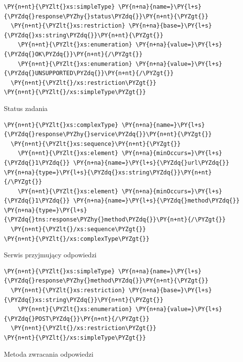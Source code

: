 \begin{program}
\begin{code}
\begin{Verbatim}[commandchars=\\\{\}]
\PY{n+nt}{\PYZlt{}xs:simpleType} \PY{n+na}{name=}\PY{l+s}{\PYZdq{}response\PYZhy{}status\PYZdq{}}\PY{n+nt}{\PYZgt{}}
  \PY{n+nt}{\PYZlt{}xs:restriction} \PY{n+na}{base=}\PY{l+s}{\PYZdq{}xs:string\PYZdq{}}\PY{n+nt}{\PYZgt{}}
    \PY{n+nt}{\PYZlt{}xs:enumeration} \PY{n+na}{value=}\PY{l+s}{\PYZdq{}OK\PYZdq{}}\PY{n+nt}{/\PYZgt{}}
    \PY{n+nt}{\PYZlt{}xs:enumeration} \PY{n+na}{value=}\PY{l+s}{\PYZdq{}UNSUPPORTED\PYZdq{}}\PY{n+nt}{/\PYZgt{}}
  \PY{n+nt}{\PYZlt{}/xs:restriction\PYZgt{}}
\PY{n+nt}{\PYZlt{}/xs:simpleType\PYZgt{}}
\end{Verbatim}
\end{code}
\caption{Status zadania}
\end{program}

\begin{program}
\begin{code}
\begin{Verbatim}[commandchars=\\\{\}]
\PY{n+nt}{\PYZlt{}xs:complexType} \PY{n+na}{name=}\PY{l+s}{\PYZdq{}response\PYZhy{}service\PYZdq{}}\PY{n+nt}{\PYZgt{}}
  \PY{n+nt}{\PYZlt{}xs:sequence}\PY{n+nt}{\PYZgt{}}
    \PY{n+nt}{\PYZlt{}xs:element} \PY{n+na}{minOccurs=}\PY{l+s}{\PYZdq{}1\PYZdq{}} \PY{n+na}{name=}\PY{l+s}{\PYZdq{}url\PYZdq{}} \PY{n+na}{type=}\PY{l+s}{\PYZdq{}xs:string\PYZdq{}}\PY{n+nt}{/\PYZgt{}}
    \PY{n+nt}{\PYZlt{}xs:element} \PY{n+na}{minOccurs=}\PY{l+s}{\PYZdq{}1\PYZdq{}} \PY{n+na}{name=}\PY{l+s}{\PYZdq{}method\PYZdq{}} \PY{n+na}{type=}\PY{l+s}{\PYZdq{}tns:response\PYZhy{}method\PYZdq{}}\PY{n+nt}{/\PYZgt{}}
  \PY{n+nt}{\PYZlt{}/xs:sequence\PYZgt{}}
\PY{n+nt}{\PYZlt{}/xs:complexType\PYZgt{}}
\end{Verbatim}
\end{code}
\caption{Serwis przyjmujący odpowiedzi}
\end{program}

\begin{program}
\begin{code}
\begin{Verbatim}[commandchars=\\\{\}]
\PY{n+nt}{\PYZlt{}xs:simpleType} \PY{n+na}{name=}\PY{l+s}{\PYZdq{}response\PYZhy{}method\PYZdq{}}\PY{n+nt}{\PYZgt{}}
  \PY{n+nt}{\PYZlt{}xs:restriction} \PY{n+na}{base=}\PY{l+s}{\PYZdq{}xs:string\PYZdq{}}\PY{n+nt}{\PYZgt{}}
    \PY{n+nt}{\PYZlt{}xs:enumeration} \PY{n+na}{value=}\PY{l+s}{\PYZdq{}POST\PYZdq{}}\PY{n+nt}{/\PYZgt{}}
  \PY{n+nt}{\PYZlt{}/xs:restriction\PYZgt{}}
\PY{n+nt}{\PYZlt{}/xs:simpleType\PYZgt{}}
\end{Verbatim}
\end{code}
\caption{Metoda zwracania odpowiedzi}
\end{program}

